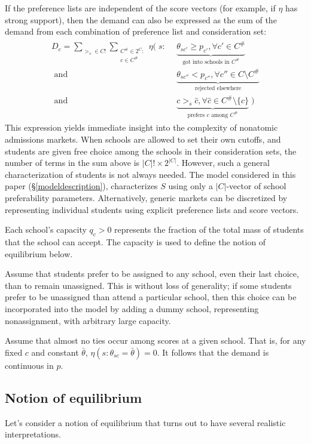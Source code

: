 \documentclass[12pt]{article}
\theoremstyle{definition}
\begin{document}
If the preference lists are independent of the score vectors (for example, if $\eta$ has strong support), then the demand can also be expressed as the sum of the demand from each combination of preference list and consideration set:
\begin{gather} \label{demandbigsum}
\begin{aligned}
D_c = 
\sum_{>_s \in C!} \sum_{\substack{C^\# \in 2^{C}:\\ c \in C^\#}}
\eta\Big(\;s:&~~\underbrace{\theta_{sc'} \geq p_{c'}, \forall c' \in C^\#}_{\text{got into schools in } C^\# } \\
\text{ and} &~~\underbrace{\theta_{sc''} < p_{c''}, \forall c'' \in C \setminus C^\#}_{\text{rejected elsewhere}} \\
\text{ and} &~~\underbrace{c >_s \hat c, \forall \hat c \in C^\#\setminus \{c\}}_{\text{prefers } c \text{ among } C^\#} \;\Big)
\end{aligned}
\end{gather}
This expression yields immediate insight into the complexity of nonatomic admissions markets. When schools are allowed to set their own cutoffs, and students are given free choice among the schools in their consideration sets, the number of terms in the sum above is $|C|!\times2^{|C|}$. However, such a general characterization of students is not always needed. The model considered in this paper (\S\ref{modeldescription}), characterizes $S$ using only a $|C|$-vector of school preferability parameters. Alternatively, generic markets can be discretized by representing individual students using explicit preference lists and score vectors. 

Each school's capacity $q_c > 0$ represents the fraction of the total mass of students that the school can accept. The capacity is used to define the notion of equilibrium below.

Assume that students prefer to be assigned to any school, even their last choice, than to remain unassigned. This is without loss of generality; if some students prefer to be unassigned than attend a particular school, then this choice can be incorporated into the model by adding a dummy school, representing nonassignment, with arbitrary large capacity. 

Assume that almost no ties occur among scores at a given school. That is, for any fixed $c$ and constant $\bar \theta$, $\eta( s: \theta_{sc} = \bar \theta) = 0$. It follows that the demand is continuous in $p$. 

\subsection{Notion of equilibrium}
Let's consider a notion of equilibrium that turns out to have several realistic interpretations. 
\end{document}
